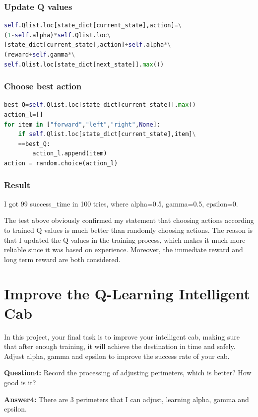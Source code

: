 \documentclass[11pt,a4paper]{article}
\begin{document}
\subsubsection{Update Q values}
\begin{lstlisting}[language={Python}]
self.Qlist.loc[state_dict[current_state],action]=\
(1-self.alpha)*self.Qlist.loc\
[state_dict[current_state],action]+self.alpha*\
(reward+self.gamma*\
self.Qlist.loc[state_dict[next_state]].max())
\end{lstlisting}
\subsubsection{Choose best action}
\begin{lstlisting}[language={Python}]
best_Q=self.Qlist.loc[state_dict[current_state]].max()
action_l=[]
for item in ["forward","left","right",None]:
    if self.Qlist.loc[state_dict[current_state],item]\
    ==best_Q:
        action_l.append(item)
action = random.choice(action_l)
\end{lstlisting}
\subsubsection{Result}

I got 99 success\_time in 100 tries, where alpha=0.5, gamma=0.5, epsilon=0.

\vspace{3mm}
\noindent The test above obviously confirmed my statement that choosing actions according to trained Q values is much better than randomly choosing actions. The reason is that I updated the Q values in the training process, which makes it much more reliable since it was based on experience. Moreover, the immediate reward and long term reward are both considered.

\section{Improve the Q-Learning Intelligent Cab}
In this project, your final task is to improve your intelligent cab, making sure that after enough training, it will achieve the destination in time and safely. Adjust alpha, gamma and epsilon to improve the success rate of your cab.

\vspace{3mm}
\noindent \textbf{Question4:}  Record the processing of adjusting perimeters, which is better? How good is it?

\vspace{3mm}
\noindent \textbf{Answer4:} There are 3 perimeters that I can adjust, learning alpha, gamma and epsilon. 
\end{document}
